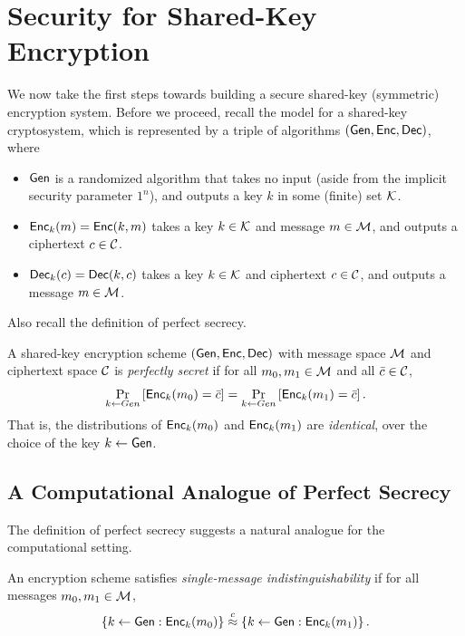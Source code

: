 \documentclass[11pt]{article}
\begin{document}
\section{Security for Shared-Key Encryption}
\label{sec:security-shared-key}

We now take the first steps towards building a secure shared-key
(symmetric) encryption system.  Before we proceed, recall the model
for a shared-key cryptosystem, which is represented by a triple of
algorithms $(\mathsf{Gen}, \mathsf{Enc},\mathsf{Dec})$, where
\begin{itemize}
\item $\mathsf{Gen}$ is a randomized algorithm that takes no input (aside
  from the implicit security parameter $1^{n}$), and outputs a key $k$
  in some (finite) set $\mathcal{K}$.
\item $\mathsf{Enc}_k(m) = \mathsf{Enc}(k,m)$ takes a key $k \in \mathcal{K}$ and
  message $m \in \mathcal{M}$, and outputs a ciphertext $c \in
  \mathcal{C}$.
\item $\mathsf{Dec}_k(c) = \mathsf{Dec}(k, c)$ takes a key $k \in \mathcal{K}$ and
  ciphertext $c \in \mathcal{C}$, and outputs a message $m \in
  \mathcal{M}$.
\end{itemize}

Also recall the definition of perfect secrecy.

\begin{definition}
  A shared-key encryption scheme $(\mathsf{Gen}, \mathsf{Enc}, \mathsf{Dec})$ with
  message space $\mathcal{M}$ and ciphertext space $\mathcal{C}$ is
  \textit{perfectly secret} if for all $m_0, m_1 \in \mathcal{M}$ and
  all $\bar{c} \in \mathcal{C}$,
  \[ \Pr_{k \gets Gen} \left[ \mathsf{Enc}_k(m_0) = \bar{c} \right] =
  \Pr_{k \gets Gen} \left[ \mathsf{Enc}_k(m_1) = \bar{c} \right]. \] That
  is, the distributions of $\mathsf{Enc}_{k}(m_{0})$ and
  $\mathsf{Enc}_{k}(m_{1})$ are \emph{identical}, over the choice of the
  key $k \gets \mathsf{Gen}$.
\end{definition}

\subsection{A Computational Analogue of Perfect Secrecy}
\label{sec:comp-anal-perf}

The definition of perfect secrecy suggests a natural analogue for the
computational setting.

\begin{definition}
  \label{def:single-msg-indist}
  An encryption scheme satisfies \emph{single-message
    indistinguishability} if for all messages $m_0,m_1 \in \mathcal{M}$,
  \[ \left\{ k \gets \mathsf{Gen} : \mathsf{Enc}_k(m_0) \right\} \stackrel{c}{\approx}
  \left\{ k \gets \mathsf{Gen} : \mathsf{Enc}_k(m_1) \right\}. \]
\end{definition}
\end{document}
